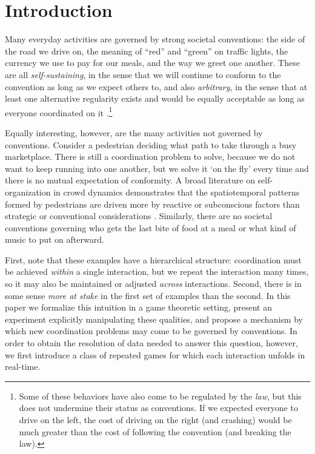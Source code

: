 \documentclass[10pt,letterpaper]{article}
\begin{document}
\linenumbers

\section*{Introduction}
Many everyday activities are governed by strong societal conventions: the side of the road we drive on, the meaning of ``red'' and ``green'' on traffic lights, the currency we use to pay for our meals, and the way we greet one another. These are all \emph{self-sustaining}, in the sense that we will continue to conform to the convention as long as we expect others to, and also \emph{arbitrary}, in the sense that at least one alternative regularity exists and would be equally acceptable as long as everyone coordinated on it \cite{Lewis08_Convention}.\footnote{Some of these behaviors have also come to be regulated by the \emph{law}, but this does not undermine their status as conventions. If we expected everyone to drive on the left, the cost of driving on the right (and crashing) would be much greater than the cost of following the convention (and breaking the law).}

Equally interesting, however, are the many activities not governed by conventions. Consider a pedestrian deciding what path to take through a busy marketplace. There is still a coordination problem to solve, because we do not want to keep running into one another, but we solve it `on the fly' every time and there is no mutual expectation of conformity. A broad literature on self-organization in crowd dynamics demonstrates that the spatiotemporal patterns formed by pedestrians are driven more by reactive or subconscious factors than strategic or conventional considerations \cite{HelbingBuznaWerner05_PedestrianCrowdDynamics}. Similarly, there are no societal conventions governing who gets the last bite of food at a meal or what kind of music to put on afterward. 

First, note that these examples have a hierarchical structure: coordination must be achieved \emph{within} a single interaction, but we repeat the interaction many times, so it may also be maintained or adjusted \emph{across} interactions. Second, there is in some sense \emph{more at stake} in the first set of examples than the second. In this paper we formalize this intuition in a game theoretic setting, present an experiment explicitly manipulating these qualities, and propose a mechanism by which new coordination problems may come to be governed by conventions. In order to obtain the resolution of data needed to answer this question, however, we first introduce a class of repeated games for which each interaction unfolds in real-time.
\end{document}
